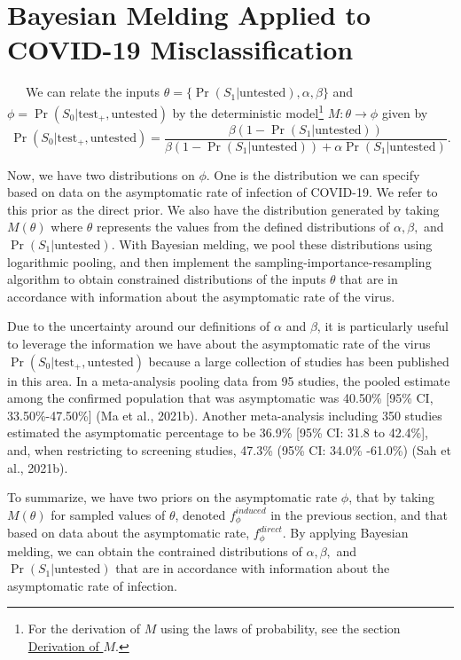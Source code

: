 \documentclass[12pt,twoside]{smiththesis}
\begin{document}
\hypertarget{meld}{%
\section{Bayesian Melding Applied to COVID-19 Misclassification}\label{meld}}

~~~We can relate the inputs \(\theta = \{\Pr(S_1|\text{untested}), \alpha, \beta \}\) and \(\phi = \Pr(S_0|\text{test}_+,\text{untested})\) by the deterministic model\footnote{For the derivation of \(M\) using the laws of probability, see the section \protect\hyperlink{derivation}{Derivation of \(M\)}.} \(M: \theta \to \phi\) given by \[\Pr(S_0|\text{test}_+, \text{untested}) = \dfrac{\beta(1 - \Pr(S_1|\text{untested}))}{\beta(1-\Pr(S_1|\text{untested})) + \alpha \Pr(S_1|\text{untested})}.\]

Now, we have two distributions on \(\phi\). One is the distribution we can specify based on data on the asymptomatic rate of infection of COVID-19. We refer to this prior as the direct prior. We also have the distribution generated by taking \(M(\theta)\) where \(\theta\) represents the values from the defined distributions of \(\alpha,\beta,\) and \(\Pr(S_1|\text{untested})\). With Bayesian melding, we pool these distributions using logarithmic pooling, and then implement the sampling-importance-resampling algorithm to obtain constrained distributions of the inputs \(\theta\) that are in accordance with information about the asymptomatic rate of the virus.

Due to the uncertainty around our definitions of \(\alpha\) and \(\beta\), it is particularly useful to leverage the information we have about the asymptomatic rate of the virus \(\Pr(S_0|\text{test}_+,\text{untested})\) because a large collection of studies has been published in this area. In a meta-analysis pooling data from 95 studies, the pooled estimate among the confirmed population that was asymptomatic was 40.50\% {[}95\% CI, 33.50\%-47.50\%{]} (Ma et al., 2021b). Another meta-analysis including 350 studies estimated the asymptomatic percentage to be 36.9\% {[}95\% CI: 31.8 to 42.4\%{]}, and, when restricting to screening studies, 47.3\% (95\% CI: 34.0\% -61.0\%) (Sah et al., 2021b).

To summarize, we have two priors on the asymptomatic rate \(\phi\), that by taking \(M(\theta)\) for sampled values of \(\theta\), denoted \(f_\phi^{induced}\) in the previous section, and that based on data about the asymptomatic rate, \(f_\phi^{direct}\). By applying Bayesian melding, we can obtain the contrained distributions of \(\alpha,\beta,\) and \(\Pr(S_1|\text{untested})\) that are in accordance with information about the asymptomatic rate of infection.
\end{document}
